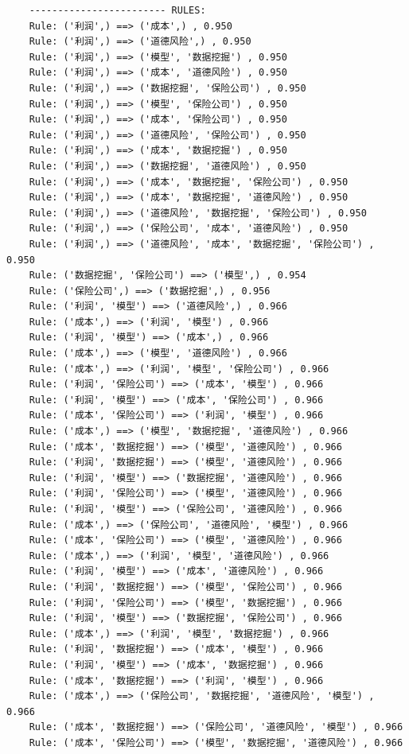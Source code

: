 \documentclass[lang=cn,11pt,a4paper,cite=authoryear]{elegantpaper}
\begin{document}
\begin{lstlisting}
	------------------------ RULES:
	Rule: ('利润',) ==> ('成本',) , 0.950
	Rule: ('利润',) ==> ('道德风险',) , 0.950
	Rule: ('利润',) ==> ('模型', '数据挖掘') , 0.950
	Rule: ('利润',) ==> ('成本', '道德风险') , 0.950
	Rule: ('利润',) ==> ('数据挖掘', '保险公司') , 0.950
	Rule: ('利润',) ==> ('模型', '保险公司') , 0.950
	Rule: ('利润',) ==> ('成本', '保险公司') , 0.950
	Rule: ('利润',) ==> ('道德风险', '保险公司') , 0.950
	Rule: ('利润',) ==> ('成本', '数据挖掘') , 0.950
	Rule: ('利润',) ==> ('数据挖掘', '道德风险') , 0.950
	Rule: ('利润',) ==> ('成本', '数据挖掘', '保险公司') , 0.950
	Rule: ('利润',) ==> ('成本', '数据挖掘', '道德风险') , 0.950
	Rule: ('利润',) ==> ('道德风险', '数据挖掘', '保险公司') , 0.950
	Rule: ('利润',) ==> ('保险公司', '成本', '道德风险') , 0.950
	Rule: ('利润',) ==> ('道德风险', '成本', '数据挖掘', '保险公司') , 0.950
	Rule: ('数据挖掘', '保险公司') ==> ('模型',) , 0.954
	Rule: ('保险公司',) ==> ('数据挖掘',) , 0.956
	Rule: ('利润', '模型') ==> ('道德风险',) , 0.966
	Rule: ('成本',) ==> ('利润', '模型') , 0.966
	Rule: ('利润', '模型') ==> ('成本',) , 0.966
	Rule: ('成本',) ==> ('模型', '道德风险') , 0.966
	Rule: ('成本',) ==> ('利润', '模型', '保险公司') , 0.966
	Rule: ('利润', '保险公司') ==> ('成本', '模型') , 0.966
	Rule: ('利润', '模型') ==> ('成本', '保险公司') , 0.966
	Rule: ('成本', '保险公司') ==> ('利润', '模型') , 0.966
	Rule: ('成本',) ==> ('模型', '数据挖掘', '道德风险') , 0.966
	Rule: ('成本', '数据挖掘') ==> ('模型', '道德风险') , 0.966
	Rule: ('利润', '数据挖掘') ==> ('模型', '道德风险') , 0.966
	Rule: ('利润', '模型') ==> ('数据挖掘', '道德风险') , 0.966
	Rule: ('利润', '保险公司') ==> ('模型', '道德风险') , 0.966
	Rule: ('利润', '模型') ==> ('保险公司', '道德风险') , 0.966
	Rule: ('成本',) ==> ('保险公司', '道德风险', '模型') , 0.966
	Rule: ('成本', '保险公司') ==> ('模型', '道德风险') , 0.966
	Rule: ('成本',) ==> ('利润', '模型', '道德风险') , 0.966
	Rule: ('利润', '模型') ==> ('成本', '道德风险') , 0.966
	Rule: ('利润', '数据挖掘') ==> ('模型', '保险公司') , 0.966
	Rule: ('利润', '保险公司') ==> ('模型', '数据挖掘') , 0.966
	Rule: ('利润', '模型') ==> ('数据挖掘', '保险公司') , 0.966
	Rule: ('成本',) ==> ('利润', '模型', '数据挖掘') , 0.966
	Rule: ('利润', '数据挖掘') ==> ('成本', '模型') , 0.966
	Rule: ('利润', '模型') ==> ('成本', '数据挖掘') , 0.966
	Rule: ('成本', '数据挖掘') ==> ('利润', '模型') , 0.966
	Rule: ('成本',) ==> ('保险公司', '数据挖掘', '道德风险', '模型') , 0.966
	Rule: ('成本', '数据挖掘') ==> ('保险公司', '道德风险', '模型') , 0.966
	Rule: ('成本', '保险公司') ==> ('模型', '数据挖掘', '道德风险') , 0.966

\end{lstlisting}
\end{document}
